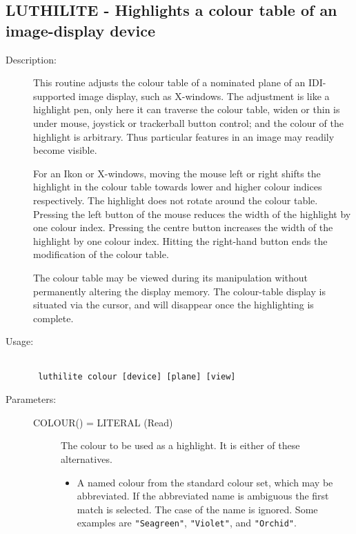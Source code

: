 \documentclass[twoside,11pt]{article}
\newcommand{\stardocinitials}  {SUN}
\newcommand{\stardocnumber}    {239.2}
\newcommand{\stardocname}{\stardocinitials /\stardocnumber}
\newcommand{\htmlref}[2]{#1}
\newcommand{\xlabel}[1]{}
\newlength{\sstbannerlength}
\newlength{\sstcaptionlength}
\newlength{\sstexampleslength}
\newlength{\sstexampleswidth}
\newcommand{\sstroutine}[3]{
   \goodbreak
   \markboth{{\stardocname}~ --- #1}{{\stardocname}~ --- #1}
   \rule{\textwidth}{0.5mm}
   \vspace{-7ex}
   \newline
   \settowidth{\sstbannerlength}{{\Large {\bf #1}}}
   \setlength{\sstcaptionlength}{\textwidth}
   \setlength{\sstexampleslength}{\textwidth}
   \addtolength{\sstbannerlength}{0.5em}
   \addtolength{\sstcaptionlength}{-2.0\sstbannerlength}
   \addtolength{\sstcaptionlength}{-4.9pt}
   \settowidth{\sstexampleswidth}{{\bf Examples:}}
   \addtolength{\sstexampleslength}{-\sstexampleswidth}
   \parbox[t]{\sstbannerlength}{\flushleft{\Large {\bf #1}}}
   \parbox[t]{\sstcaptionlength}{\center{\Large #2}}
   \parbox[t]{\sstbannerlength}{\flushright{\Large {\bf #1}}}
   \begin{description}
      #3
   \end{description}
}
\newcommand{\sstdescription}[1]{\item[Description:] #1}
\newcommand{\sstusage}[1]{\pagebreak[3] \item[Usage:] \mbox{} \\[1.3ex] {\ssttt #1}}
\newcommand{\sstparameters}[1]{
   \goodbreak 
   \item[Parameters:] \mbox{} \\
   \vspace{-3.5ex}
   \begin{description}
      #1
   \end{description}
}
\newcommand{\sstsubsection}[1]{ \item[{#1}] \mbox{} \\}
\newcommand{\ssttt}{\tt}
\renewcommand{\sstroutine}[3]{
      \subsection{#1\xlabel{#1}-\label{#1}#2}
      \begin{description}
         #3
      \end{description}
   }
\renewcommand{\sstdescription}[1]{\item[Description:]
      \begin{description}
         #1
      \end{description}
   }
\renewcommand{\sstusage}[1]{\htmlref{\item[Usage:]}{ap:usage} \mbox{} \\ {\ssttt #1}}
\renewcommand{\sstparameters}[1]{
      \htmlref{\item[Parameters:]}{se:param}
      \begin{description}
         #1
      \end{description}
   }
\renewcommand{\sstsubsection}[1]{\item[{#1}]}
\begin{document}
\sstroutine{
   LUTHILITE
}{
   Highlights a colour table of an image-display device
}{
   \sstdescription{
      This routine adjusts the colour table of a nominated plane of
      an IDI-supported image display, such as X-windows.  The adjustment
      is like a highlight pen, only here it can traverse the colour
      table, widen or thin is under mouse, joystick or trackerball
      button control; and the colour of the highlight is arbitrary.
      Thus particular features in an image may readily become visible.

      For an Ikon or X-windows, moving the mouse left or right shifts
      the highlight in the colour table towards lower and higher colour
      indices respectively.  The highlight does not rotate around the
      colour table.  Pressing the left button of the mouse reduces the
      width of the highlight by one colour index.  Pressing the centre
      button increases the width of the highlight by one colour index.
      Hitting the right-hand button ends the modification of the colour
      table.

      The colour table may be viewed during its manipulation without
      permanently altering the display memory.  The colour-table
      display is situated via the cursor, and will disappear once the
      highlighting is complete.
   }
   \sstusage{
      luthilite colour [device] [plane] [view]
   }
   \sstparameters{
      \sstsubsection{
         COLOUR() = LITERAL (Read)
      }{
         The colour to be used as a highlight.  It is either of these
         alternatives.
         \begin{itemize}
           \item  A named colour from the standard colour set, which may
           be abbreviated.  If the abbreviated name is ambiguous the
           first match is selected.  The case of the name is ignored.
           Some examples are {\tt "Seagreen"}, {\tt "Violet"}, and
           {\tt "Orchid"}.


\end{itemize}}}}
\end{document}
